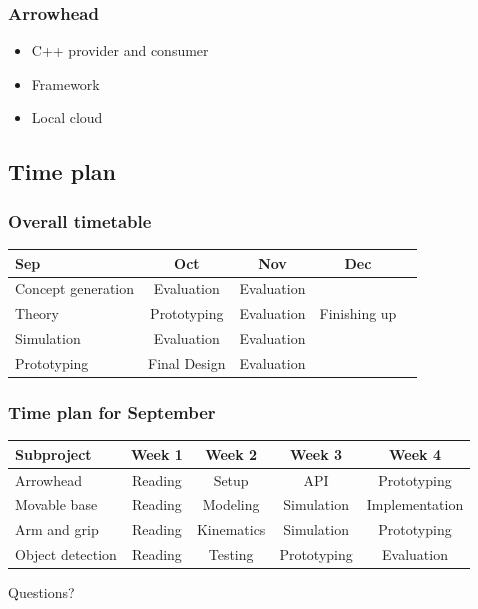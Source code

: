 \documentclass{beamer}
\begin{document}
\begin{frame}
    \frametitle{Arrowhead}
    \begin{itemize}
        \item C++ provider and consumer
        \item Framework 
        \item Local cloud
    \end{itemize}
\end{frame}













\begin{frame}
    \subsection{Time plan}
    \frametitle{Overall timetable}
    \begin{table}
        \begin{tabular}{| l | c | c | c | c }
            
            Sep & Oct & Nov & Dec \\
            \hline \hline
            Concept generation & Evaluation & Evaluation &  \\ 
            \hline
            Theory & Prototyping & Evaluation & Finishing up \\
            \hline
            Simulation & Evaluation & Evaluation & \\
            \hline
            Prototyping & Final Design & Evaluation &  \\
            \hline
 
        \end{tabular}
    \end{table}    
\end{frame}


\begin{frame}
    \frametitle{Time plan for September}
    \begin{table}
        \begin{tabular}{l | c | c | c | c }
        Subproject & Week 1 & Week 2 & Week 3 & Week 4 \\
        \hline \hline
            Arrowhead & Reading& Setup & API & Prototyping\\
            Movable base & Reading& Modeling & Simulation & Implementation\\
            Arm and grip  & Reading & Kinematics & Simulation& Prototyping\\
            Object detection & Reading & Testing & Prototyping & Evaluation\\
        \end{tabular}
    \end{table}
\end{frame}


\begin{frame}
    \begin{center}
        \Huge Questions?
    \end{center}
\end{frame}
\end{document}
